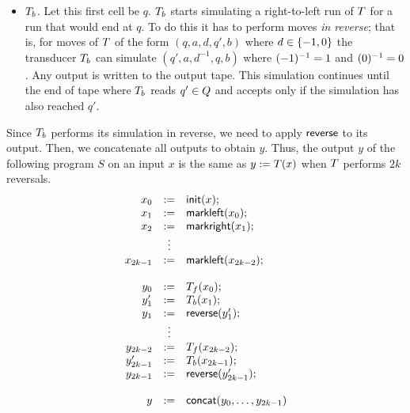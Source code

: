 {\begin{itemize}
	\item
	$T_b$. %
	Let this first cell be $q$.
    $T_b$  starts simulating a right-to-left run of $T$ for a run
	that would end at $q$.
	To do this it has to perform moves \emph{in reverse};
	that is, for moves of $T$ of the form
	$(q, a, d, q', b)$
	where
	$d \in \{-1, 0\}$
	the transducer $T_b$ can simulate
	$(q', a, d^{-1}, q, b)$
	where
	$(-1)^{-1} = 1$
	and
	$(0)^{-1} = 0$.
	Any output is written to the output tape.
	This simulation continues until the end of tape where $T_b$ reads 
	$q' \in Q$
	and accepts only if the simulation has also reached $q'$.
\end{itemize}

Since $T_b$ performs its simulation in reverse, we need to apply
$\mathsf{reverse}$ to its output.
%
Then, we concatenate all outputs to obtain $y$.
%
Thus, the output $y$ of the following program $S$ on an input $x$ is the same
as
$y := T(x)$
when $T$ performs $2k$ reversals.
\[
\begin{array}{rcl}
x_0 &:=& \mathsf{init}(x); \\
x_1 &:=& \mathsf{markleft}(x_0); \\
x_2 &:=& \mathsf{markright}(x_1); \\
&\vdots& \\
x_{2k-1} &:=& \mathsf{markleft}(x_{2k-2}); \\
\\
y_0 &:=& T_f(x_0); \\
y'_1 &:=& T_b(x_1); \\
y_1 &:=& \mathsf{reverse}(y'_1); \\
&\vdots& \\
y_{2k-2} &:=& T_f(x_{2k-2}); \\
y'_{2k-1} &:=& T_b(x_{2k-1}); \\
y_{2k-1} &:=& \mathsf{reverse}(y'_{2k-1}); \\
\\
y &:=& \mathsf{concat}(y_0, \ldots, y_{2k-1})
\end{array}
\]
}

